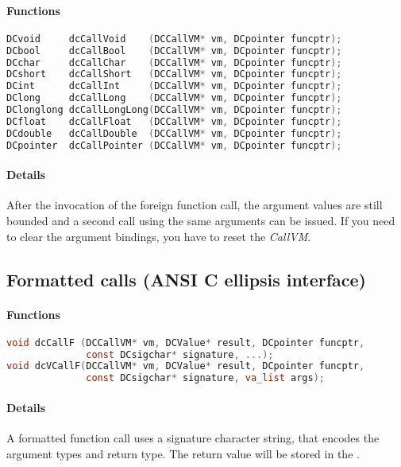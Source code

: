 \paragraph{Functions}

\begin{lstlisting}[language=c]
DCvoid     dcCallVoid    (DCCallVM* vm, DCpointer funcptr);
DCbool     dcCallBool    (DCCallVM* vm, DCpointer funcptr);
DCchar     dcCallChar    (DCCallVM* vm, DCpointer funcptr);
DCshort    dcCallShort   (DCCallVM* vm, DCpointer funcptr);
DCint      dcCallInt     (DCCallVM* vm, DCpointer funcptr);
DClong     dcCallLong    (DCCallVM* vm, DCpointer funcptr);
DClonglong dcCallLongLong(DCCallVM* vm, DCpointer funcptr);
DCfloat    dcCallFloat   (DCCallVM* vm, DCpointer funcptr);
DCdouble   dcCallDouble  (DCCallVM* vm, DCpointer funcptr);
DCpointer  dcCallPointer (DCCallVM* vm, DCpointer funcptr);
\end{lstlisting}

\paragraph{Details}

After the invocation of the foreign function call, the argument values are still bounded and a second call using the
same arguments can be issued. If you need to clear the argument bindings, 
you have to reset the \emph{CallVM}.

\pagebreak

\subsection{Formatted calls (ANSI C ellipsis interface)}

\paragraph{Functions}

\begin{lstlisting}[language=c]
void dcCallF (DCCallVM* vm, DCValue* result, DCpointer funcptr, 
              const DCsigchar* signature, ...);
void dcVCallF(DCCallVM* vm, DCValue* result, DCpointer funcptr, 
              const DCsigchar* signature, va_list args);
\end{lstlisting}

\paragraph{Details}

A formatted function call uses a signature character string, that encodes
the argument types and return type.
The return value will be stored in the \lstinline@DCValue@.

